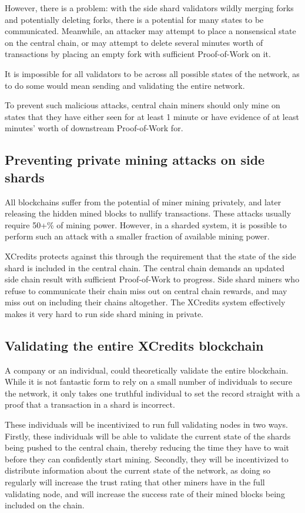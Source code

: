 \documentclass[a4paper,12pt]{article}
\begin{document}
However, there is a problem: with the side shard validators wildly merging forks and potentially deleting forks, there is a potential for many states to be communicated. Meanwhile, an attacker may attempt to place a nonsensical state on the central chain, or may attempt to delete several minutes worth of transactions by placing an empty fork with sufficient Proof-of-Work on it.

It is impossible for all validators to be across all possible states of the network, as to do some would mean sending and validating the entire network. 

To prevent such malicious attacks, central chain miners should only mine on states that they have either seen for at least 1 minute or have evidence of at least minutes' worth of downstream Proof-of-Work for. 


\subsection{Preventing private mining attacks on side shards}
All blockchains suffer from the potential of miner mining privately, and later releasing the hidden mined blocks to nullify transactions. These attacks usually require 50+\% of mining power. However, in a sharded system, it is possible to perform such an attack with a smaller fraction of available mining power.

XCredits protects against this through the requirement that the state of the side shard is included in the central chain. The central chain demands an updated side chain result with sufficient Proof-of-Work to progress. Side shard miners who refuse to communicate their chain miss out on central chain rewards, and may miss out on including their chains altogether. The XCredits system effectively makes it very hard to run side shard mining in private. 

\subsection{Validating the entire XCredits blockchain}
A company or an individual, could theoretically validate the entire blockchain. While it is not fantastic form to rely on a small number of individuals to secure the network, it only takes one truthful individual to set the record straight with a proof that a transaction in a shard is incorrect. 

These individuals will be incentivized to run full validating nodes in two ways. Firstly, these individuals will be able to validate the current state of the shards being pushed to the central chain, thereby reducing the time they have to wait before they can confidently start mining. Secondly, they will be incentivized to distribute information about the current state of the network, as doing so regularly will increase the trust rating that other miners have in the full validating node, and will increase the success rate of their mined blocks being included on the chain. 
\end{document}
